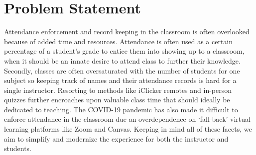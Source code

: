 \section{Problem Statement}
\label{sec:problem}
Attendance enforcement and record keeping in the classroom is often overlooked because of added time and resources. Attendance is often used as a certain percentage of a student’s grade to entice them into showing up to a classroom, when it should be an innate desire to attend class to further their knowledge. Secondly, classes are often oversaturated with the number of students for one subject so keeping track of names and their attendance records is hard for a single instructor. Resorting to methods like iClicker remotes and in-person quizzes further encroaches upon valuable class time that should ideally be dedicated to teaching. The COVID-19 pandemic has also made it difficult to enforce attendance in the classroom due an overdependence on ‘fall-back’ virtual learning platforms like Zoom and Canvas. Keeping in mind all of these facets, we aim to simplify and modernize the experience for both the instructor and students.
